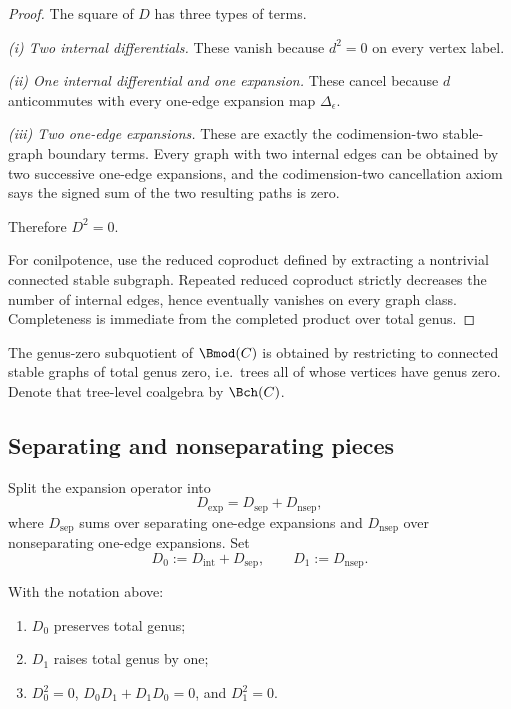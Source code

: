 \begin{proof}
The square of $D$ has three types of terms.

\smallskip
\noindent
\emph{(i) Two internal differentials.}
These vanish because $d^2=0$ on every vertex label.

\smallskip
\noindent
\emph{(ii) One internal differential and one expansion.}
These cancel because $d$ anticommutes with every one-edge expansion map $\Delta_\epsilon$.

\smallskip
\noindent
\emph{(iii) Two one-edge expansions.}
These are exactly the codimension-two stable-graph boundary terms. Every graph with two
internal edges can be obtained by two successive one-edge expansions, and the codimension-two
cancellation axiom says the signed sum of the two resulting paths is zero.

Therefore $D^2=0$.

For conilpotence, use the reduced coproduct defined by extracting a nontrivial connected
stable subgraph. Repeated reduced coproduct strictly decreases the number of internal
edges, hence eventually vanishes on every graph class. Completeness is immediate from
the completed product over total genus.
\end{proof}

\begin{remark}
The genus-zero subquotient of $\Bmod(C)$ is obtained by restricting to connected stable
graphs of total genus zero, i.e.\ trees all of whose vertices have genus zero. Denote
that tree-level coalgebra by $\Bch(C)$.
\end{remark}

\subsection{Separating and nonseparating pieces}

Split the expansion operator into
\[
D_{\mathrm{exp}}=D_{\mathrm{sep}}+D_{\mathrm{nsep}},
\]
where $D_{\mathrm{sep}}$ sums over separating one-edge expansions and $D_{\mathrm{nsep}}$
over nonseparating one-edge expansions. Set
\[
D_0:=D_{\mathrm{int}}+D_{\mathrm{sep}},
\qquad
D_1:=D_{\mathrm{nsep}}.
\]

\begin{proposition}\label{prop:D0D1}
With the notation above:
\begin{enumerate}[leftmargin=2.4em]
\item $D_0$ preserves total genus;
\item $D_1$ raises total genus by one;
\item $D_0^2=0$, $D_0D_1+D_1D_0=0$, and $D_1^2=0$.
\end{enumerate}
\end{proposition}

